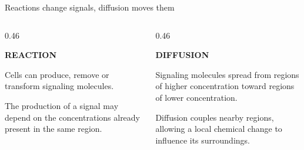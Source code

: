 \begin{frame}{Reactions change signals, diffusion moves them}

  \vspace{0.30cm}

  \begin{columns}[T,onlytextwidth]

    \begin{column}{0.46\textwidth}

      {\color{HydraGold}\bfseries
       \fontsize{11.5}{13.5}\selectfont
       REACTION\par}

      \vspace{0.35cm}

        {Cells can produce, remove or transform signaling molecules.}

      \vspace{0.25cm}

        {The production of a signal may depend on the concentrations already present in the same region.}

    \end{column}

    \begin{column}{0.46\textwidth}

      {\color{HydraCyan}\bfseries
       \fontsize{11.5}{13.5}\selectfont
       DIFFUSION\par}

      \vspace{0.35cm}

        {Signaling molecules spread from regions of higher concentration toward regions of lower concentration.}

      \vspace{0.25cm}

        {Diffusion couples nearby regions, allowing a local chemical change to influence its surroundings.}

    \end{column}

  \end{columns}

  \vfill


\end{frame}




